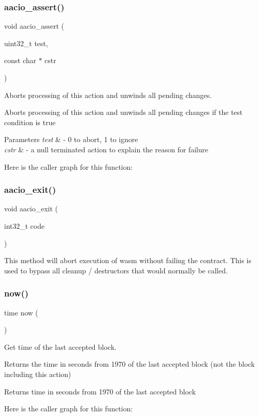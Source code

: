 \subsubsection{\texorpdfstring{aacio\+\_\+assert()}{aacio\_assert()}}
{\footnotesize\ttfamily void aacio\+\_\+assert (\begin{DoxyParamCaption}\item[{uint32\+\_\+t}]{test,  }\item[{const char $\ast$}]{cstr }\end{DoxyParamCaption})}



Aborts processing of this action and unwinds all pending changes. 

Aborts processing of this action and unwinds all pending changes if the test condition is true 
\begin{DoxyParams}{Parameters}
{\em test} & -\/ 0 to abort, 1 to ignore \\
\hline
{\em cstr} & -\/ a null terminated action to explain the reason for failure \\
\hline
\end{DoxyParams}
Here is the caller graph for this function\+:
\mbox{\label{group__systemcapi_ga129383e61d5dcdb54059f55f0ac2e9bc}} 
\subsubsection{\texorpdfstring{aacio\+\_\+exit()}{aacio\_exit()}}
{\footnotesize\ttfamily void aacio\+\_\+exit (\begin{DoxyParamCaption}\item[{int32\+\_\+t}]{code }\end{DoxyParamCaption})}

This method will abort execution of wasm without failing the contract. This is used to bypass all cleanup / destructors that would normally be called. \mbox{\label{group__systemcapi_ga5eef43c9589d6ef54a0ece1dda5e0ffe}} 
\subsubsection{\texorpdfstring{now()}{now()}}
{\footnotesize\ttfamily time now (\begin{DoxyParamCaption}{ }\end{DoxyParamCaption})}



Get time of the last accepted block. 

Returns the time in seconds from 1970 of the last accepted block (not the block including this action) \begin{DoxyReturn}{Returns}
time in seconds from 1970 of the last accepted block 
\end{DoxyReturn}
Here is the caller graph for this function\+:
